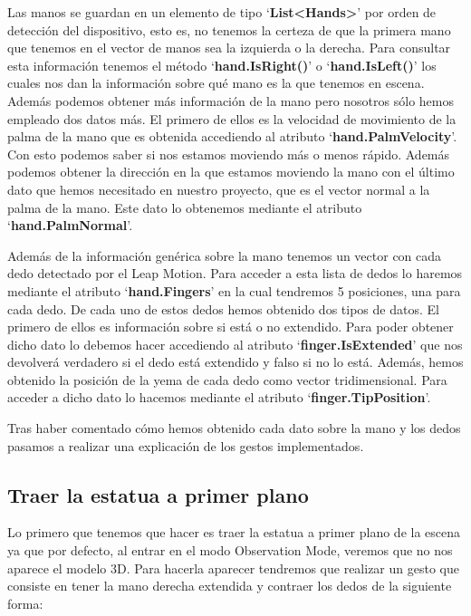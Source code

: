\documentclass[a4paper,11pt]{article}
\begin{document}
\vspace{10px}

Las manos se guardan en un elemento de tipo `\textbf{List<Hands>}' por orden de detección del dispositivo, esto es, no tenemos la certeza de que la primera mano que tenemos en el vector de manos sea la izquierda o la derecha. Para consultar esta información tenemos el método `\textbf{hand.IsRight()}' o `\textbf{hand.IsLeft()}' los cuales nos dan la información sobre qué mano es la que tenemos en escena. Además podemos obtener más información de la mano pero nosotros sólo hemos empleado dos datos más. El primero de ellos es la velocidad de movimiento de la palma de la mano que es obtenida accediendo al atributo `\textbf{hand.PalmVelocity}'. Con esto podemos saber si nos estamos moviendo más o menos rápido. Además podemos obtener la dirección en la que estamos moviendo la mano con el último dato que hemos necesitado en nuestro proyecto, que es el vector normal a la palma de la mano. Este dato lo obtenemos mediante el atributo `\textbf{hand.PalmNormal}'.

\vspace{10px}

Además de la información genérica sobre la mano tenemos un vector con cada dedo detectado por el Leap Motion. Para acceder a esta lista de dedos lo haremos mediante el atributo `\textbf{hand.Fingers}' en la cual tendremos 5 posiciones, una para cada dedo. De cada uno de estos dedos hemos obtenido dos tipos de datos. El primero de ellos es información sobre si está o no extendido. Para poder obtener dicho dato lo debemos hacer accediendo al atributo `\textbf{finger.IsExtended}' que nos devolverá verdadero si el dedo está extendido y falso si no lo está. Además, hemos obtenido la posición de la yema de cada dedo como vector tridimensional. Para acceder a dicho dato lo hacemos mediante el atributo `\textbf{finger.TipPosition}'.

\vspace{10px}

Tras haber comentado cómo hemos obtenido cada dato sobre la mano y los dedos pasamos a realizar una explicación de los gestos implementados.

\subsection{Traer la estatua a primer plano}

Lo primero que tenemos que hacer es traer la estatua a primer plano de la escena ya que por defecto, al entrar en el modo Observation Mode, veremos que no nos aparece el modelo 3D. Para hacerla aparecer tendremos que realizar un gesto que consiste en tener la mano derecha extendida y contraer los dedos de la siguiente forma:
\end{document}
